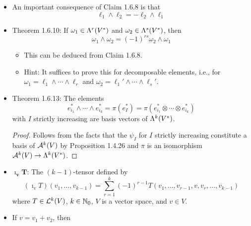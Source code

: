 \documentclass[../notes.tex]{subfiles}
\begin{document}
\begin{itemize}
\begin{proof}
\begin{align*}
            &= \pi[(-1)^\sigma T+W]\\
            &= (-1)^\sigma\pi(T)\\
            &= (-1)^\sigma\pi(\ell_1\otimes\cdots\otimes\ell_k)\\
            &= (-1)^\sigma\ell_1\wedge\cdots\wedge\ell_k
        \end{align*}
        as desired.
    \end{proof}
    \item An important consequence of Claim 1.6.8 is that
    \begin{equation*}
        \ell_1\wedge\ell_2 = -\ell_2\wedge\ell_1
    \end{equation*}
    \item Theorem 1.6.10: If $\omega_1\in\lam[r]{V^*}$ and $\omega_2\in\lam[s]{V^*}$, then
    \begin{equation*}
        \omega_1\wedge\omega_2 = (-1)^{rs}\omega_2\wedge\omega_1
    \end{equation*}
    \begin{itemize}
        \item This can be deduced from Claim 1.6.8.
        \item Hint: It suffices to prove this for decomposable elements, i.e., for $\omega_1=\ell_1\wedge\cdots\wedge\ell_r$ and $\omega_2=\ell_1'\wedge\cdots\wedge\ell_s'$.
    \end{itemize}
    \item Theorem 1.6.13: The elements
    \begin{equation*}
        e_{i_1}^*\wedge\cdots\wedge e_{i_k}^* = \pi(e_I^*) = \pi(e_{i_1}^*\otimes\cdots\otimes e_{i_k}^*)
    \end{equation*}
    with $I$ strictly increasing are basis vectors of $\lam[k]{V^*}$.
    \begin{proof}
        Follows from the facts that the $\psi_I$ for $I$ strictly increasing constitute a basis of $\alt[k]{V}$ by Proposition 1.4.26 and $\pi$ is an isomorphism $\alt[k]{V}\to\lam[k]{V^*}$.
    \end{proof}
    \item $\bm{\imath_vT}$: The $(k-1)$-tensor defined by
    \begin{equation*}
        (\imath_vT)(v_1,\dots,v_{k-1}) = \sum_{r=1}^k(-1)^{r-1}T(v_1,\dots,v_{r-1},v,v_r,\dots,v_{k-1})
    \end{equation*}
    where $T\in\lin[k]{V}$, $k\in\N_0$, $V$ is a vector space, and $v\in V$.
    \item If $v=v_1+v_2$, then

\end{itemize}
\end{document}
